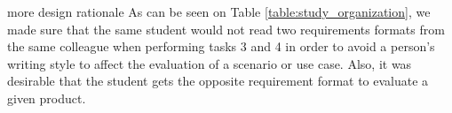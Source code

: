 more design rationale
As can be seen on Table \ref{table:study_organization}, we made sure that the same student would not read two requirements formats from the same colleague when performing tasks 3 and 4 in order to avoid a person's writing style to affect the evaluation of a scenario or use case. Also, it was desirable that the student gets the opposite requirement format to evaluate a given product. 

